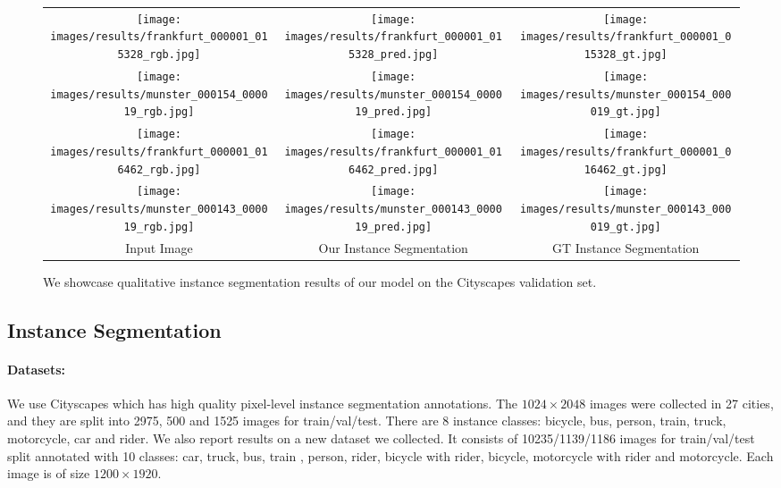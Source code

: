 \documentclass[10pt,twocolumn,letterpaper]{article}
\begin{document}
\begin{figure*} [t!]
\vspace{-0.5cm}
\centering
\setlength\tabcolsep{2pt}
\begin{tabular}{ccc}

\texttt{[image: images/results/frankfurt\_000001\_015328\_rgb.jpg]} &
\texttt{[image: images/results/frankfurt\_000001\_015328\_pred.jpg]} &
\texttt{[image: images/results/frankfurt\_000001\_015328\_gt.jpg]}\\

\texttt{[image: images/results/munster\_000154\_000019\_rgb.jpg]} &
\texttt{[image: images/results/munster\_000154\_000019\_pred.jpg]} &
\texttt{[image: images/results/munster\_000154\_000019\_gt.jpg]}\\

\texttt{[image: images/results/frankfurt\_000001\_016462\_rgb.jpg]} &
\texttt{[image: images/results/frankfurt\_000001\_016462\_pred.jpg]} &
\texttt{[image: images/results/frankfurt\_000001\_016462\_gt.jpg]}\\

\texttt{[image: images/results/munster\_000143\_000019\_rgb.jpg]} &
\texttt{[image: images/results/munster\_000143\_000019\_pred.jpg]} &
\texttt{[image: images/results/munster\_000143\_000019\_gt.jpg]}\\

Input Image & Our Instance Segmentation & GT Instance Segmentation

\end{tabular}
\caption{We showcase qualitative instance segmentation results of our model on the Cityscapes validation set.}
\label{fig:results}
\vspace{-4mm}
\end{figure*}
 
\subsection{Instance Segmentation}  \label{ssec:instance-seg}

\paragraph{Datasets:}
We use Cityscapes \cite{cityscapes} which has high quality pixel-level instance segmentation annotations. The $1024 \times 2048$ images were collected in  27  cities, and  they are split into 2975, 500 and 1525 images for train/val/test. There are 8 instance classes: bicycle, bus, person, train, truck, motorcycle, car and rider.  
We also report results on a new  dataset we collected. It consists of 10235/1139/1186  images for train/val/test split annotated with 10 classes: car, truck, bus, train , person, rider, bicycle with rider, bicycle, motorcycle with rider and motorcycle. Each image is of size $1200 \times 1920$. 
\end{document}

